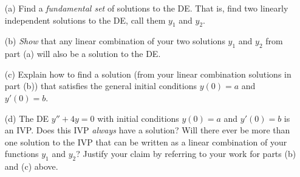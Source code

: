 \documentclass[epsf]{article}
\begin{document}
\begin{itemize}
\item[(a)] Find a \textit{fundamental set} of solutions to the DE.  That is, find two linearly independent solutions to the DE, call them $y_1$ and $y_2$.
\vskip 1in
\item[(b)] \textit{Show} that any linear combination of your two solutions $y_1$ and $y_2$ from part (a) will also be a solution to the DE.

\newpage
\item[(c)] Explain how to find a solution (from your linear combination solutions in part (b)) that satisfies the general initial conditions $y(0)=a$ and $y'(0)=b$. 

\vskip 4in
\item[(d)] The DE $y'' + 4y = 0$ with initial conditions $y(0)=a$ and $y'(0)=b$ is an IVP.  Does this IVP \textit{always} have a solution?  Will there ever be more than one solution to the IVP that can be written as a linear combination of your functions $y_1$ and $y_2$?  Justify your claim by referring to your work for parts (b) and (c) above.
\end{itemize}
\end{document}
